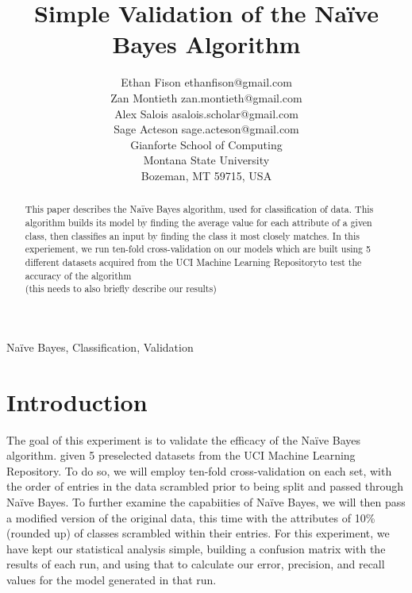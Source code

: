 \documentclass[twoside,11pt]{article}
\begin{document}
\title{Simple Validation of the Naïve Bayes Algorithm}

\author{\name Ethan Fison \email ethanfison@gmail.com \\
        \name Zan Montieth \email zan.montieth@gmail.com \\
        \name Alex Salois \email asalois.scholar@gmail.com \\ 
        \name Sage Acteson \email sage.acteson@gmail.com \\ 
       \addr Gianforte School of Computing\\
       Montana State University\\
       Bozeman, MT 59715, USA}



\maketitle

\begin{abstract}%
This paper describes the Na{\"i}ve Bayes algorithm, used for classification
of data. This algorithm builds its model by finding the average value for each
attribute of a given class, then classifies an input by finding the class it 
most closely matches. In this experiement, we run ten-fold cross-validation 
on our models which are built using 5 different datasets acquired from the UCI Machine 
Learning Repositoryto test the accuracy of the algorithm\\
(this needs to also briefly describe our results)

\end{abstract}

\begin{keywords}
  Na{\"i}ve Bayes, Classification, Validation
\end{keywords}

\section{Introduction}

The goal of this experiment is to validate the efficacy of the Naïve Bayes 
algorithm. given 5 preselected datasets from the UCI Machine Learning Repository.\citep{Cancer,Glass,Iris,Soybean,Vote}
To do so, we will employ ten-fold cross-validation on each set, with the order of 
entries in the data scrambled prior to being split and passed through Naïve Bayes.
To further examine the capabiities of Naïve Bayes, we will then pass a modified 
version of the original data, this time with the attributes of 10\% (rounded up) of 
classes scrambled within their entries. For this experiment, we have kept our 
statistical analysis simple, building a confusion matrix with the results of each run,
and using that to calculate our error, \citep{Project, Precision} precision, and recall values for the model 
generated in that run.\\
\end{document}
